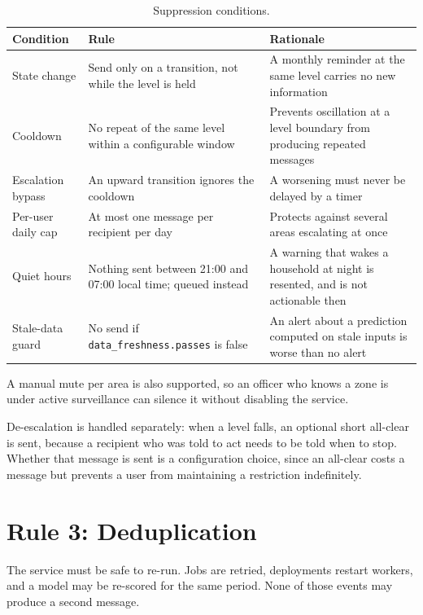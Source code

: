 \documentclass[10pt,openany]{report}
\begin{document}
\begin{table}[htbp]
\centering
\caption{Suppression conditions.}
\label{tab:suppression}
\small
\begin{tabular}{@{}>{\raggedright\arraybackslash}p{3.1cm}>{\raggedright\arraybackslash}p{5.2cm}>{\raggedright\arraybackslash}p{5.5cm}@{}}
\toprule
\textbf{Condition} & \textbf{Rule} & \textbf{Rationale} \\
\midrule
State change & Send only on a transition, not while the level is held & A monthly reminder at the same level carries no new information \\
Cooldown & No repeat of the same level within a configurable window & Prevents oscillation at a level boundary from producing repeated messages \\
Escalation bypass & An upward transition ignores the cooldown & A worsening must never be delayed by a timer \\
Per-user daily cap & At most one message per recipient per day & Protects against several areas escalating at once \\
Quiet hours & Nothing sent between 21:00 and 07:00 local time; queued instead & A warning that wakes a household at night is resented, and is not actionable then \\
Stale-data guard & No send if \texttt{data\_freshness.passes} is false & An alert about a prediction computed on stale inputs is worse than no alert \\
\bottomrule
\end{tabular}
\end{table}

A manual mute per area is also supported, so an officer who knows a zone is under active
surveillance can silence it without disabling the service.

De-escalation is handled separately: when a level falls, an optional short all-clear is sent,
because a recipient who was told to act needs to be told when to stop. Whether that message is sent
is a configuration choice, since an all-clear costs a message but prevents a user from maintaining
a restriction indefinitely.

\section{Rule 3: Deduplication}

The service must be safe to re-run. Jobs are retried, deployments restart workers, and a model may
be re-scored for the same period. None of those events may produce a second message.
\end{document}
